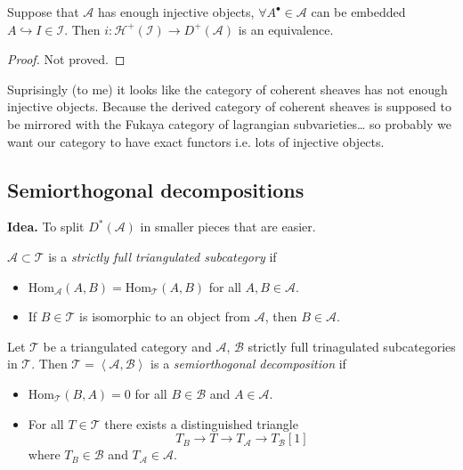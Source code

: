 \begin{lemma}
\label{lemma-embedding-of-injective-subcategory}
Suppose that $\mathcal{A}$ has enough injective objects, 
$\forall A^\bullet \in \mathcal{A}$ can be embedded 
$A \hookrightarrow I \in\mathcal{I}$. Then 
$i:\mathcal{H}^+(\mathcal{I}) \to D^+(\mathcal{A})$ is an equivalence.
\end{lemma}

\begin{proof}
Not proved.
\end{proof}

Suprisingly (to me) it looks like the category of coherent sheaves has not
enough injective objects. Because the derived category of coherent sheaves is
supposed to be mirrored with the Fukaya category of lagrangian subvarieties… so
probably we want our category to have exact functors i.e. lots of injective
objects.

\subsection*{Semiorthogonal decompositions}
\label{subsection-semiorthogonal-decompositions}

{\bf Idea.} To split $D^*(\mathcal{A})$ in smaller pieces that are easier.

\begin{definition}
\label{definition-strictly-full-triangulated-subcategory}
$\mathcal{A} \subset \mathcal{T}$ is a {\it strictly full triangulated
subcategory} if
\begin{itemize}
\item $\text{Hom}_{\mathcal{A}}(A,B)=\text{Hom}_{\mathcal{T}}(A,B)$ for all $A,B
\in \mathcal{A}$.
\item If  $B \in \mathcal{T}$ is isomorphic to an object from $\mathcal{A}$,
then $B \in \mathcal{A}$.
\end{itemize}
\end{definition}

\begin{definition}
\label{definition-semiorthogonal-decomposition}
Let $\mathcal{T}$ be a triangulated category and $\mathcal{A}$, $\mathcal{B}$
strictly full trinagulated subcategories in $\mathcal{T}$. Then
$\mathcal{T}=\left<\mathcal{A},\mathcal{B}\right>$ is a {\it semiorthogonal
decomposition} if
\begin{itemize}
\item $\text{Hom}_{\mathcal{T}}(B,A)=0$ for all $B \in \mathcal{B}$ and $A\in
\mathcal{A}$.
\item For all $T \in \mathcal{T}$ there exists a distinguished triangle
$$
T_B \to T \to T_{\mathcal{A}}\to T_{\mathcal{B}}[1]
$$
where $T_B \in \mathcal{B}$ and $T_\mathcal{A} \in \mathcal{A}$.
\end{itemize}
\end{definition}

